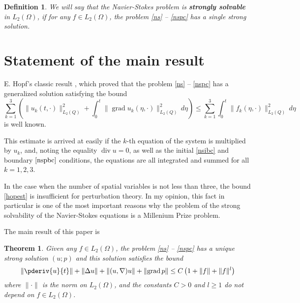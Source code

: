 \documentclass{article}
\DeclareMathOperator{\divr}{div}
\DeclareMathOperator{\grad}{grad}
\numberwithin{equation}{section}
\newtheorem{defn}{Definition}
\newtheorem{thm}{Theorem}
\begin{document}
\begin{defn}
    We will say that the Navier-Stokes problem is \textbf{strongly solvable}
    in $L_2(\Omega)$, if for any $f\in L_2(\Omega)$, the problem \eqref{ns} -- \eqref{nspc}
    has a single strong solution.
\end{defn}

\section{Statement of the main result}

E. Hopf's classic result \cite{hop1}, which proved that the problem \eqref{ns} -- \eqref{nspc}
has a generalized solution satisfying the bound
\begin{equation}
    \sum_{k=1}^3\left( \lVert u_k(t,\cdot) \rVert^{2}_{L_2(Q)} +
    \int_0^t \lVert \grad u_k(\eta, \cdot)\rVert ^2 _{L_2(Q)}\,d\eta \right)
    \leq \sum_{k=1}^3\int_0^t \lVert f_k(\eta, \cdot)\rVert ^2 _{L_2(Q)}\,d\eta
    \label{hopest}
\end{equation}
is well known.

This estimate is arrived at easily if the $k$-th equation of the system is
multiplied by $u_k$, and, noting the equality $\divr u = 0$, as well as the
initial \eqref{nsibc} and boundary $\eqref{nspbc}$ conditions, the equations are
all integrated and summed for all $k=1,2,3$.

In the case when the number of spatial variables is not less than three, the
bound \eqref{hopest} is insufficient for perturbation theory. In my opinion,
this fact in particular is one of the most important reasons why the problem
of the strong solvability of the Navier-Stokes equations is a Millenium Prize
problem.

The main result of this paper is

\begin{thm}
    Given any $f\in L_2(\Omega)$, the problem \eqref{ns} -- \eqref{nspc} has a
    unique strong solution $(u;p)$ and this solution satisfies the bound
    \begin{equation}
        \left\lVert \pderiv{u}{t} \right\rVert + \lVert \Delta u \rVert +
        \lVert (u, \nabla)u \rVert + \lVert\grad p\rVert \leq 
        C \left( 1 + \lVert f \rVert + \lVert f \rVert^l \right)
        \label{soln}
    \end{equation}
    where $\lVert \cdot \rVert$ is the norm on $L_2(\Omega)$, and the
    constants $C > 0$ and $l \geq 1$ do not depend on $f \in L_2(\Omega)$.
\end{thm}
\end{document}
